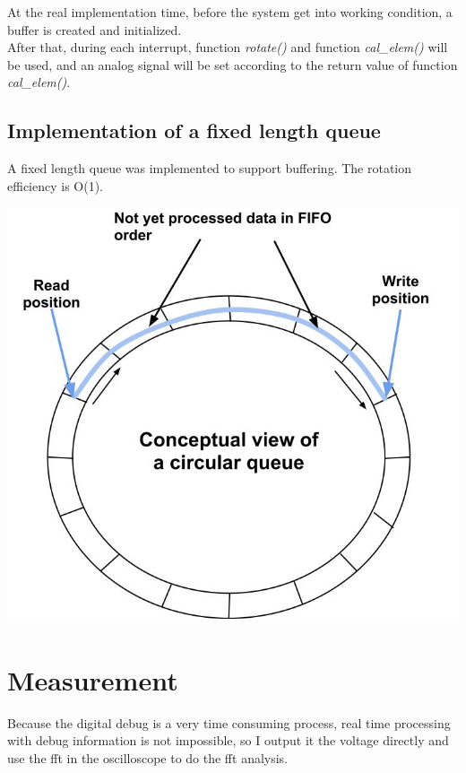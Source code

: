 \documentclass[11pt]{scrartcl}
\begin{document}
At the real implementation time, before the system get into working condition, a buffer is created and initialized. \\

After that, during each interrupt, function \textit{rotate()} and function \textit{cal\_elem()} will be used, and an analog signal will be set according to the return value of function \textit{cal\_elem()}.
\subsection{Implementation of a fixed length queue}

A fixed length queue was implemented to support buffering. The rotation efficiency is O(1).
\begin{center}
\begin{minipage}[t]{\linewidth}

{
\includegraphics[scale = 0.5]{circularqueue.jpg}
}
\end{minipage}
\medskip
\end{center}
\section{Measurement}

Because the digital debug is a very time consuming process, real time processing with debug information is not impossible, so I output it the voltage directly and use the fft in the oscilloscope to do the fft analysis.
\end{document}

